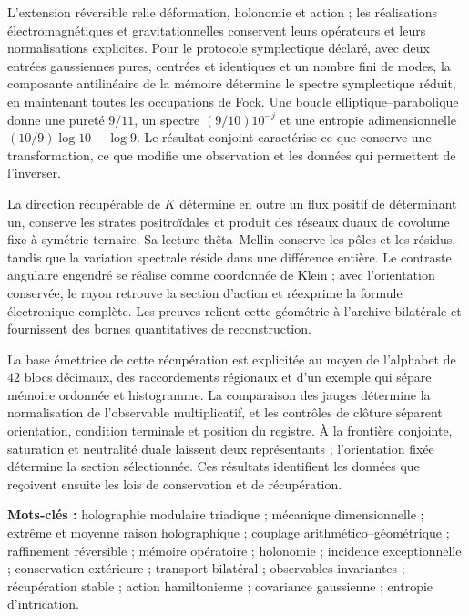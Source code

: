 L’extension réversible relie déformation, holonomie et action ; les réalisations électromagnétiques et gravitationnelles conservent leurs opérateurs et leurs normalisations explicites. Pour le protocole symplectique déclaré, avec deux entrées gaussiennes pures, centrées et identiques et un nombre fini de modes, la composante antilinéaire de la mémoire détermine le spectre symplectique réduit, en maintenant toutes les occupations de Fock. Une boucle elliptique--parabolique donne une pureté \(9/11\), un spectre \((9/10)10^{-j}\) et une entropie adimensionnelle \((10/9)\log10-\log9\). Le résultat conjoint caractérise ce que conserve une transformation, ce que modifie une observation et les données qui permettent de l’inverser.


\medskip
La direction récupérable de \(K\) détermine en outre un flux positif de déterminant un, conserve les strates positroïdales et produit des réseaux duaux de covolume fixe à symétrie ternaire. Sa lecture thêta--Mellin conserve les pôles et les résidus, tandis que la variation spectrale réside dans une différence entière. Le contraste angulaire engendré se réalise comme coordonnée de Klein ; avec l’orientation conservée, le rayon retrouve la section d’action et réexprime la formule électronique complète. Les preuves relient cette géométrie à l’archive bilatérale et fournissent des bornes quantitatives de reconstruction.


La base émettrice de cette récupération est explicitée au moyen de l'alphabet de \(42\) blocs décimaux, des raccordements régionaux et d'un exemple qui sépare mémoire ordonnée et histogramme. La comparaison des jauges détermine la normalisation de l'observable multiplicatif, et les contrôles de clôture séparent orientation, condition terminale et position du registre. À la frontière conjointe, saturation et neutralité duale laissent deux représentants ; l'orientation fixée détermine la section sélectionnée. Ces résultats identifient les données que reçoivent ensuite les lois de conservation et de récupération.

\noindent\textbf{Mots-clés :} holographie modulaire triadique ; mécanique dimensionnelle ; extrême et moyenne raison holographique ; couplage arithmético--géométrique ; raffinement réversible ; mémoire opératoire ; holonomie ; incidence exceptionnelle ; conservation extérieure ; transport bilatéral ; observables invariantes ; récupération stable ; action hamiltonienne ; covariance gaussienne ; entropie d’intrication.


